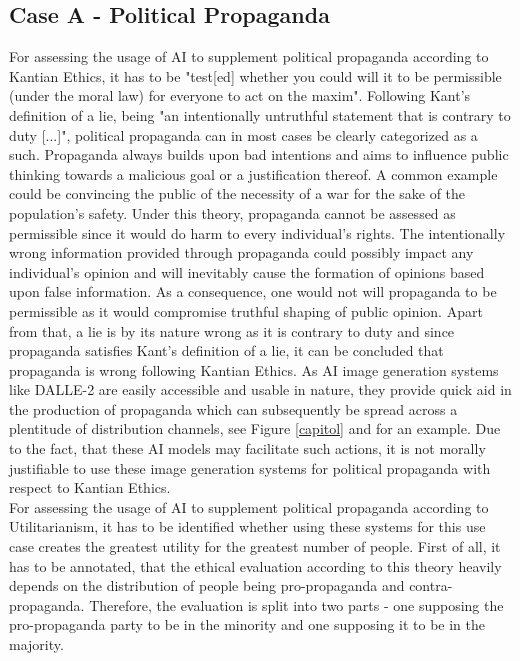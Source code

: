 \documentclass[10pt,twocolumn,twoside]{osajnl}
\begin{document}
\subsection{Case A - Political Propaganda}
For assessing the usage of AI to supplement political propaganda according to Kantian Ethics, it has to be "test[ed] whether you could will it to be permissible (under the moral law) for everyone to act on the maxim"\cite{kant}.
Following Kant's definition of a lie, being "an intentionally untruthful statement that is contrary to duty [...]"\cite{kant}, political propaganda can in most cases be clearly categorized as a such.
Propaganda always builds upon bad intentions and aims to influence public thinking towards a malicious goal or a justification thereof. A common example could be convincing the public
of the necessity of a war for the sake of the population's safety. Under this theory, propaganda cannot be assessed as permissible since it would do harm to every individual's rights.
The intentionally wrong information provided through propaganda could possibly impact any individual's opinion and will inevitably cause the formation of opinions based 
upon false information. As a consequence, one would not will propaganda to be permissible as it would compromise truthful shaping of public opinion. 
Apart from that, a lie is by its nature wrong as it is contrary to duty \cite{kant} and %
since propaganda satisfies Kant's definition of a lie, it can be concluded that propaganda is wrong following Kantian Ethics. 
As AI image generation systems like DALLE-2 are easily accessible and usable in nature, they provide quick aid in the production of propaganda which can subsequently be spread across a plentitude
of distribution channels, see Figure \ref{capitol} and \cite{trump} for an example. Due to the fact, that these AI models may facilitate such actions, it is not morally justifiable to use these image generation systems for
political propaganda with respect to Kantian Ethics.
\\ %
For assessing the usage of AI to supplement political propaganda according to Utilitarianism, it has to be identified whether using these systems for this use case creates the greatest utility
for the greatest number of people. First of all, it has to be annotated, that the ethical evaluation according to this theory heavily depends on the distribution of people being pro-propaganda and 
contra-propaganda. Therefore, the evaluation is split into two parts - one supposing the pro-propaganda party to be in the minority and one supposing it to be in the majority.
\end{document}
